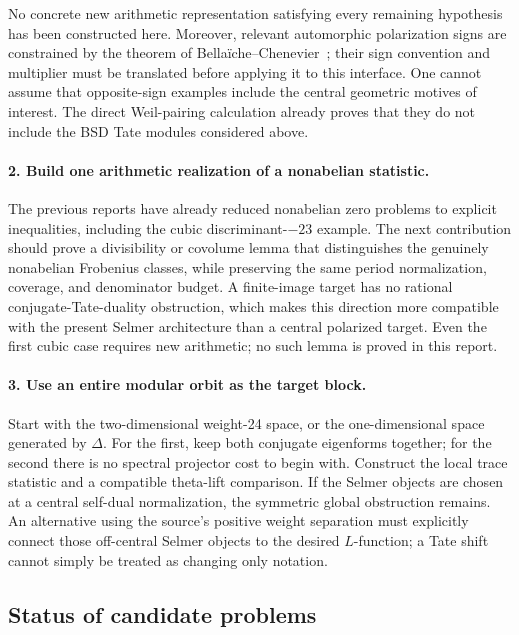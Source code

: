 No concrete new arithmetic representation satisfying every remaining
hypothesis has been constructed here. Moreover, relevant automorphic
polarization signs are constrained by the theorem of
Bella\"iche--Chenevier~\cite{bc}; their sign convention and multiplier must
be translated before applying it to this interface. One cannot assume
that opposite-sign examples include the central geometric motives of
interest. The direct Weil-pairing calculation already proves that they
do not include the BSD Tate modules considered above.

\paragraph{2. Build one arithmetic realization of a nonabelian statistic.}
The previous reports have already reduced nonabelian zero problems to
explicit inequalities, including the cubic discriminant-$-23$ example.
The next contribution should prove a divisibility or covolume lemma that
distinguishes the genuinely nonabelian Frobenius classes, while preserving
the same period normalization, coverage, and denominator budget. A
finite-image target has no rational conjugate-Tate-duality obstruction,
which makes this direction more compatible with the present Selmer
architecture than a central polarized target. Even the first cubic case
requires new arithmetic; no such lemma is proved in this report.

\paragraph{3. Use an entire modular orbit as the target block.}
Start with the two-dimensional weight-24 space, or the one-dimensional
space generated by $\Delta$. For the first, keep both conjugate eigenforms
together; for the second there is no spectral projector cost to begin
with. Construct the local trace statistic and a compatible theta-lift
comparison. If the Selmer objects are chosen at a central self-dual
normalization, the symmetric global obstruction remains. An alternative
using the source's positive weight separation must explicitly connect
those off-central Selmer objects to the desired $L$-function; a Tate shift
cannot simply be treated as changing only notation.

\subsection{Status of candidate problems}

